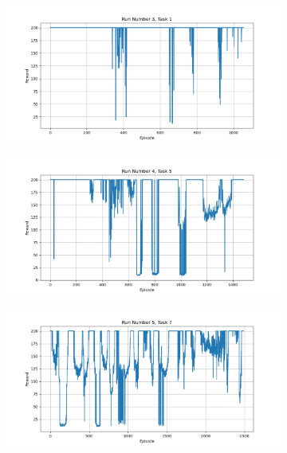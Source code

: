\documentclass[runningheads]{llncs}
\begin{document}
\begin{figure}[H]
\begin{subfigure}{.45\textwidth}
  \end{subfigure}
   \begin{subfigure}{.45\textwidth}
       \centering
       \includegraphics[width=1\textwidth] {imgs/5000_episodes/Task_1_run_3}
   \end{subfigure}
    \begin{subfigure}{.45\textwidth}
        \centering
        \includegraphics[width=1\textwidth] {imgs/5000_episodes/Task_5_run_4}
    \end{subfigure}
     \begin{subfigure}{.45\textwidth}
         \centering
         \includegraphics[width=1\textwidth] {imgs/5000_episodes/Task_7_run_5}

\end{subfigure}
\end{figure}
\end{document}

